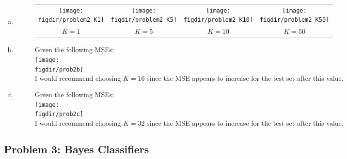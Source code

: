 \documentclass[twoside,11pt]{article}
\newcommand{\figdir}{figs}
\theoremstyle{definition}
\begin{document}
\begin{enumerate}[(a)]
\item 
\begin{figure}[H] \centering
\begin{tabular}{cccc}
\texttt{[image: \\figdir/problem2\_K1]} &
\texttt{[image: \\figdir/problem2\_K5]} &
\texttt{[image: \\figdir/problem2\_K10]} &
\texttt{[image: \\figdir/problem2\_K50]} \\
$K=1$ & $K=5$ & $K=10$ & $K=50$ \\
\end{tabular}
\end{figure}

\item 
\begin{figure}[H] \centering
Given the following MSEs: \\
\texttt{[image: \\figdir/prob2b]} \\
I would recommend choosing $K=16$ since the MSE appears to increase for the test set after this value.
\end{figure}

\item 
\begin{figure}[H] \centering
Given the following MSEs: \\
\texttt{[image: \\figdir/prob2c]} \\
I would recommend choosing $K=32$ since the MSE appears to increase for the test set after this value.
\end{figure}

\end{enumerate}


\subsection*{Problem 3: Bayes Classifiers}
\end{document}
